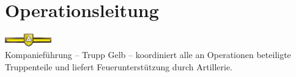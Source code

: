 \section{Operationsleitung}
\includegraphics[width=20mm]{./img/truppenordnung/opl/TrGelb}\\
Kompanieführung -- Trupp Gelb -- koordiniert alle an Operationen beteiligte Truppenteile und liefert Feuerunterstützung durch Artillerie.